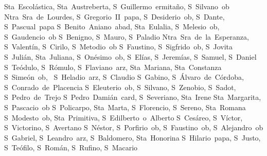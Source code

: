 Sta~Escol\'astica, Sta~Austreberta, S~Guillermo~ermita\~no, S~Silvano~ob
Ntra~Sra~de~Lourdes, S~Gregorio~II~papa, S~Desiderio~ob, S~Dante, S~Pascual~papa
S~Benito~Aniano~abad, Sta~Eulalia, S~Melesio~ob, S~Gaudencio~ob
S~Benigno, S~Mauro, S~Paladio
Ntra~Sra~de~la~Esperanza, S~Valent\'in, S~Cirilo, S~Metodio~ob
S~Faustino, S~Sigfrido~ob, S~Jovita
S~Juli\'an, Sta~Juliana, S~On\'esimo~ob, S~El\'ias, S~Jerem\'ias, S~Samuel, S~Daniel
S~Te\'odulo, S~R\'omulo, S~Flaviano~arz, Sta~Mariana, Sta~Constanza
S~Sime\'on~ob, ~S~Heladio~arz, S~Claudio
S~Gabino, S~\'Alvaro~de~C\'ordoba, S~Conrado~de~Placencia
S~Eleuterio~ob, S~Silvano, S~Zenobio, S~Sadot, S~Pedro~de~Trejo
S~Pedro~Dami\'an~card, S~Severiano, Sta~Irene
Sta~Margarita, S~Pascacio~ob
S~Policarpo, Sta~Marta, S~Florencio, S~Sereno, Sta~Romana
S~Modesto~ob, Sta~Primitiva, S~Edilberto~o~Alberto
S~Ces\'areo, S~V\'ictor, S~Victorino, S~Avertano
S~N\'estor, S~Porfirio~ob, S~Faustino~ob, S~Alejandro~ob
S~Gabriel, S~Leandro~arz, S~Baldomero, Sta~Honorina
S~Hilario~papa, S~Justo, S~Te\'ofilo, S~Rom\'an, S~Rufino, S~Macario


